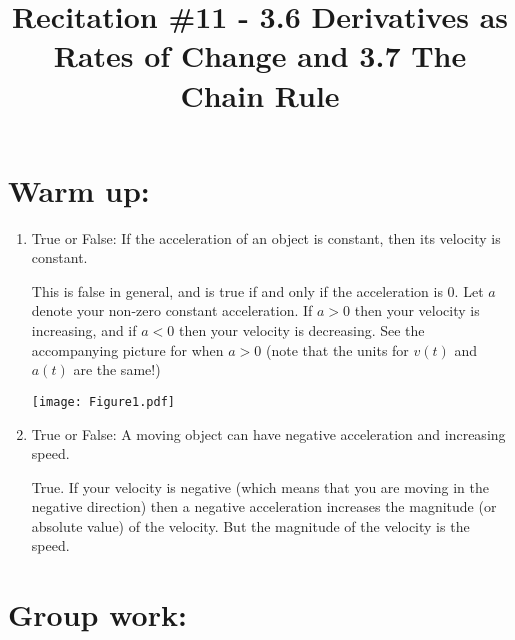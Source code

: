 \documentclass[handout,nooutcomes]{ximera}
\title{Recitation \#11 - 3.6 Derivatives as Rates of Change and 3.7 The Chain Rule}
\begin{document}
\begin{abstract}		\end{abstract}
\maketitle

\section*{Warm up:} 

	\begin{enumerate}
	
	\item  True or False:  If the acceleration of an object is constant, then its velocity is constant.

		\begin{freeResponse}
		This is false in general, and is true if and only if the acceleration is 0.  Let $a$ denote your non-zero constant acceleration.  If $a > 0$ then your velocity is increasing, and if $a < 0$ then your velocity is decreasing.  See the accompanying picture for when $a>0$ (note that the units for $v(t)$ and $a(t)$ are  the same!)
		
			\begin{image}
			\texttt{[image: Figure1.pdf]}
			\end{image}
		\end{freeResponse}	
		
		
	
	\item  True or False:  A moving object can have negative acceleration and increasing speed.

		\begin{freeResponse}
		True.  If your velocity is negative (which means that you are moving in the negative direction) then a negative acceleration increases the magnitude (or absolute value) of the velocity.  But the magnitude of the velocity is the speed.
		\end{freeResponse}	
		
		
		
	\end{enumerate}

	
	
	
	
	

\section*{Group work:}
\end{document}
